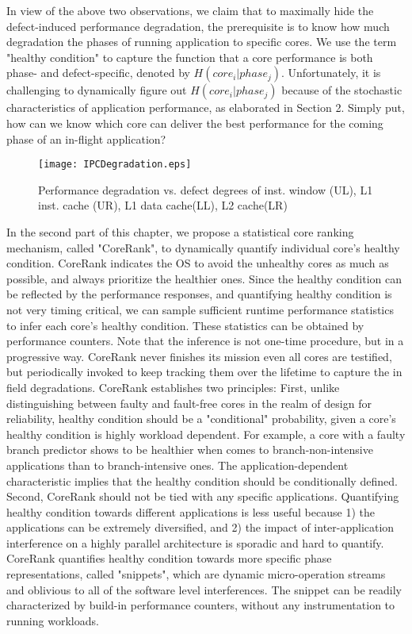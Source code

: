 In view of the above two observations, we claim that to maximally hide the defect-induced performance degradation, the prerequisite is to know how much degradation the phases of running application to specific cores. We use the term "healthy condition" to capture the function that a core performance is both phase- and defect-specific, denoted by $H(core_i|phase_j)$. Unfortunately, it is challenging to dynamically figure out $H(core_i|phase_j)$ because of the stochastic characteristics of application performance, as elaborated in Section 2. Simply put, how can we know which core can deliver the best performance for the coming phase of an in-flight application?

\begin{figure}[t]
    \centering
    \texttt{[image: IPCDegradation.eps]}\\
    \caption{Performance degradation  vs. defect degrees of inst. window  (UL), L1 inst. cache (UR), L1 data cache(LL), L2 cache(LR)}
    \label{degrade}
\end{figure}

In the second part of this chapter, we propose a statistical core ranking mechanism, called "CoreRank", to dynamically quantify individual core's healthy condition. CoreRank indicates the OS to avoid the unhealthy cores as much as possible, and always prioritize the healthier ones. Since the healthy condition can be reflected by the performance responses, and quantifying healthy condition is not very timing critical,  we can sample sufficient runtime performance statistics to infer each core's healthy condition. These statistics can be obtained by performance counters. Note that the inference is not one-time procedure, but in a progressive way. CoreRank never finishes its mission even all cores are testified, but periodically invoked to keep tracking them over the lifetime to capture the in field degradations. CoreRank establishes two principles: First, unlike distinguishing between faulty and fault-free cores in the realm of design for reliability, healthy condition should be a "conditional" probability, given a core's healthy condition is highly workload dependent. For example, a core with a faulty branch predictor shows to be healthier when comes to  branch-non-intensive applications than to branch-intensive ones. The application-dependent characteristic implies that the healthy condition should be conditionally defined. Second, CoreRank should not be tied with any specific applications. Quantifying healthy condition towards different applications is less useful because 1) the applications can be extremely diversified, and 2) the impact of inter-application interference on a highly parallel architecture is sporadic and hard to quantify.  CoreRank quantifies healthy condition towards  more specific phase representations, called "snippets", which are dynamic micro-operation streams and oblivious to all of the software level interferences. The snippet can be readily characterized by build-in performance counters, without any instrumentation to running workloads.

